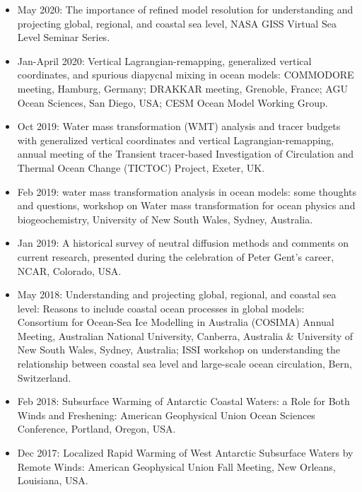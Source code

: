 \documentclass{article}
\begin{document}
\begin{itemize}[leftmargin=*]

\item May 2020: {\sc The importance of refined model resolution for understanding and projecting global, regional, and coastal sea level}, NASA GISS Virtual Sea Level Seminar Series. 

\item Jan-April 2020: {\sc Vertical Lagrangian-remapping, generalized vertical coordinates, and spurious diapycnal mixing in ocean
  models}: COMMODORE meeting, Hamburg, Germany; DRAKKAR meeting, Grenoble, France; AGU Ocean Sciences, San Diego, USA; CESM Ocean Model Working Group.  

\item Oct 2019: {\sc Water mass transformation (WMT) analysis
  and tracer budgets with generalized vertical coordinates and vertical Lagrangian-remapping}, annual meeting of the Transient tracer-based Investigation of Circulation and Thermal Ocean Change (TICTOC) Project, Exeter, UK.

\item Feb 2019: {\sc water mass transformation analysis in ocean models: some thoughts and questions}, workshop on Water mass transformation for ocean physics and biogeochemistry, University of New South Wales, Sydney, Australia.  

\item Jan 2019: {\sc A historical survey of neutral diffusion methods and comments on current research}, presented during the celebration of Peter Gent's career, NCAR, Colorado, USA.  

\item May 2018: {\sc Understanding and projecting global, regional, and coastal sea level: Reasons to include coastal ocean processes in global models}: Consortium for Ocean-Sea Ice Modelling in Australia (COSIMA) Annual Meeting, Australian National University, Canberra, Australia \& University of New South Wales, Sydney, Australia; ISSI workshop on understanding the relationship between coastal sea level and large-scale ocean circulation, Bern, Switzerland. 

\item Feb 2018: {\sc Subsurface Warming of Antarctic Coastal Waters: a Role for Both Winds and Freshening}: {\sc American Geophysical Union Ocean Sciences Conference}, Portland, Oregon, USA.

\item Dec 2017: {\sc Localized Rapid Warming of West Antarctic Subsurface Waters by Remote Winds}: American Geophysical Union Fall Meeting, New Orleans, Louisiana, USA. 


\end{itemize}
\end{document}

